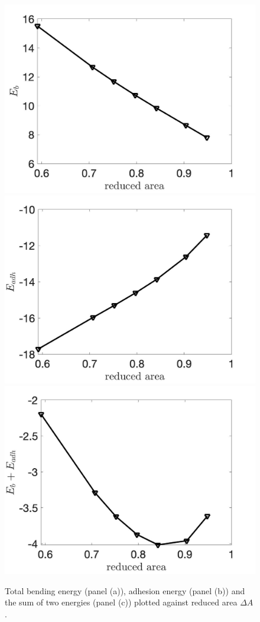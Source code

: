 \documentclass[%
preprint,
 amsmath,amssymb,
 aps,
]{revtex4-1}
\begin{document}
\begin{figure}
\includegraphics[keepaspectratio=true,scale=0.125]{figs/Dec18_Eb_vs_rA_adR0p2_adS502.jpeg}
\includegraphics[keepaspectratio=true,scale=0.125]{figs/Dec18_Eadh_vs_rA_adR0p2_adS502.jpeg}
\includegraphics[keepaspectratio=true,scale=0.125]{figs/Dec18_EbEadh_vs_rA_adR0p2_adS502.jpeg}
\caption{Total bending energy (panel (a)), adhesion energy (panel (b)) and the sum of two energies (panel (c)) plotted against reduced area $\Delta A$.}
\label{fig:Dec18_vesicle_equilibrium1}
\end{figure}
\end{document}
